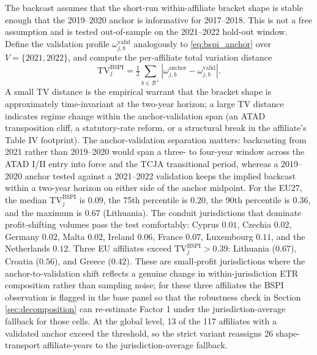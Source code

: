 \documentclass[11pt,a4paper]{article}
\begin{document}
The backcast assumes that the short-run within-affiliate bracket shape is stable enough that the 2019--2020 anchor is informative for 2017--2018. This is not a free assumption and is tested out-of-sample on the 2021--2022 hold-out window. Define the validation profile $\omega_{j,b}^{\text{valid}}$ analogously to \eqref{eq:bspi_anchor} over $V = \{2021, 2022\}$, and compute the per-affiliate total variation distance
\begin{equation}\label{eq:bspi_tv}
\text{TV}_{j}^{\text{BSPI}} = \tfrac{1}{2}\sum_{b \in \mathcal{B}^{+}}\left|\omega_{j,b}^{\text{anchor}} - \omega_{j,b}^{\text{valid}}\right|.
\end{equation}
A small TV distance is the empirical warrant that the bracket shape is approximately time-invariant at the two-year horizon; a large TV distance indicates regime change within the anchor-validation span (an ATAD transposition cliff, a statutory-rate reform, or a structural break in the affiliate's Table IV footprint). The anchor-validation separation matters: backcasting from 2021 rather than 2019--2020 would span a three- to four-year window across the ATAD I/II entry into force and the TCJA transitional period, whereas a 2019--2020 anchor tested against a 2021--2022 validation keeps the implied backcast within a two-year horizon on either side of the anchor midpoint. For the EU27, the median $\text{TV}_{j}^{\text{BSPI}}$ is $0.09$, the 75th percentile is $0.20$, the 90th percentile is $0.36$, and the maximum is $0.67$ (Lithuania). The conduit jurisdictions that dominate profit-shifting volumes pass the test comfortably: Cyprus $0.01$, Czechia $0.02$, Germany $0.02$, Malta $0.02$, Ireland $0.06$, France $0.07$, Luxembourg $0.11$, and the Netherlands $0.12$. Three EU affiliates exceed $\text{TV}_{j}^{\text{BSPI}} > 0.39$: Lithuania ($0.67$), Croatia ($0.56$), and Greece ($0.42$). These are small-profit jurisdictions where the anchor-to-validation shift reflects a genuine change in within-jurisdiction ETR composition rather than sampling noise; for these three affiliates the BSPI observation is flagged in the base panel so that the robustness check in Section \ref{sec:decomposition} can re-estimate Factor 1 under the jurisdiction-average fallback for those cells. At the global level, 13 of the 117 affiliates with a validated anchor exceed the threshold, so the strict variant reassigns 26 shape-transport affiliate-years to the jurisdiction-average fallback.
\end{document}
